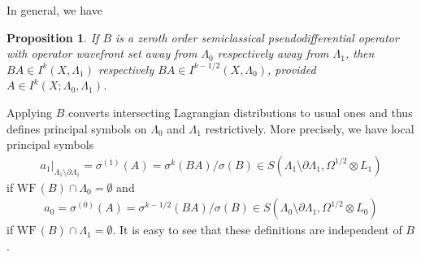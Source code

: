 \documentclass[10pt, a4paper, twoside]{amsart}
\numberwithin{equation}{section}
\newtheorem{proposition}[theorem]{Proposition}
\theoremstyle{remark}
\begin{document}
\begin{appendix}
	In general, we have
	
	\begin{proposition}\label{symboltheorem}If $B$ is a zeroth order semiclassical pseudodifferential operator with operator wavefront set away from $\Lambda_0$ respectively away from $\Lambda_1$, then $BA \in I^{k}(X, \Lambda_1)$ respectively $BA \in I^{k - 1/2}(X, \Lambda_0)$, provided $A \in I^{k}(X; \Lambda_0, \Lambda_1)$. \end{proposition}
	
	Applying $B$ converts intersecting Lagrangian distributions to usual ones and thus defines principal symbols on $\Lambda_0$ and $\Lambda_1$ restrictively. More precisely, we have local principal symbols 
	\begin{eqnarray*}
	a_1|_{\Lambda_1 \setminus \partial \Lambda_1} = \sigma^{(1)}(A) = \sigma^{k}(BA) / \sigma(B)  \in S(\Lambda_1 \setminus \partial \Lambda_1, \Omega^{1/2} \otimes L_1) 
	\end{eqnarray*} 
	if $\text{WF}\,(B) \cap \Lambda_0 = \emptyset$ and
	\begin{eqnarray*} a_0 = \sigma^{(0)}(A) = \sigma^{k-1/2}(BA) / \sigma(B) \in S(\Lambda_0 \setminus \partial \Lambda_1, \Omega^{1/2} \otimes L_0)
	\end{eqnarray*} 
	if $\text{WF}\,(B) \cap \Lambda_1 = \emptyset$. It is easy to see that these definitions are independent of $B$. 
	
	
	

\end{appendix}
\end{document}
